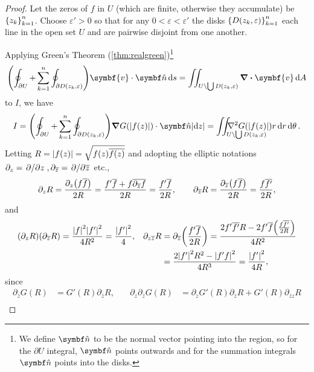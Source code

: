 \begin{proof}
    Let the zeros of \(f\) in \(U\) (which are finite, otherwise they accumulate) be \(\qty{z_k}_{k=1}^n\). Choose \(\varepsilon'>0\) so that for any \(0<\varepsilon<\varepsilon'\) the disks \(\qty{D\qty(z_k,\varepsilon)}_{k=1}^n\) each line in the open set \(U\) and are pairwise disjoint from one another.

    Applying Green's Theorem (\cref{thm:realgreen})\footnote{We define \(\vu{n}\) to be the normal vector pointing into the region, so for the \(\partial U\) integral, \(\vu{n}\) points outwards and for the summation integrals \(\vu{n}\) points into the disks.} \[\qty(\oint_{\partial U}+\sum_{k=1}^n\oint_{\partial D\qty(z_k,\varepsilon)})\symbf{v}\cdot\vu{n}\dd{s}=\iint_{U\setminus\bigcup D\qty(z_k,\varepsilon)}\divergence{\symbf{v}}\dd{A}\] to \(I\), we have
    \begin{equation}
        I=\qty(\oint_{\partial U}+\sum_{k=1}^n\oint_{\partial D\qty(z_k,\varepsilon)})\grad{G\qty(\abs{f(z)})}\cdot\vu{n}\abs{\ddz}=\mathop{\mathmakebox[\widthof{\(\iint\)}][l]{\iint_{U\setminus\bigcup D\qty(z_k,\varepsilon)}}}\laplacian{G\qty(\abs{f(z)})}r\dd{r}\dd{\theta}.\label{eq:ahlforsshimizugreens_greensapplication}
    \end{equation}
    Letting \(R=\abs{f(z)}=\sqrt{f(z)\overline{f(z)}}\) and adopting the elliptic notations \(\partial_z=\pdv*{z},\partial_{\overline{z}}=\pdv*{\overline{z}}\) etc.,
    \[\partial_zR=\frac{\partial_z\qty(f\overline{f})}{2R}=\frac{f'\overline{f}+f\overline{\partial_{\overline{z}}f}}{2R}=\frac{f'\overline{f}}{2R},\qquad\partial_{\overline{z}}R=\frac{\partial_{\overline{z}}\qty(f\overline{f})}{2R}=\frac{f\overline{f'}}{2R},\]
    and
    \begin{align*}
        \qty(\partial_zR)\qty(\partial_{\overline{z}}R) & =\frac{\abs{f}^2\abs{f'}^2}{4R^2}=\frac{\abs{f'}^2}4, & \partial_{z\overline{z}}R & =\partial_{\overline{z}}\qty(\frac{f'\overline{f}}{2R})=\frac{2f'\overline{f'}R-2f'\overline{f}\qty(\frac{f\overline{f'}}{2R})}{4R^2} \\
        &                                                       &                           & =\frac{2\abs{f'}^2R^2-\abs{f'f}^2}{4R^3}=\frac{\abs{f'}^2}{4R},
    \end{align*}
    since
    \begin{align*}
        \partial_{\overline{z}}G(R) & =G'(R)\partial_{\overline{z}}R,                  & \quad\partial_z\partial_{\overline{z}} G(R) & =\partial_zG'(R)\partial_{\overline{z}}R+G'(R)\partial_{\overline{z}z}R                   \\

\end{align*}
\end{proof}
